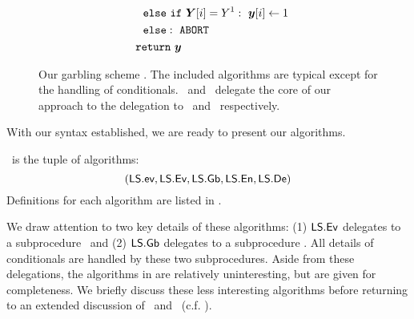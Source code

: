 \begin{figure}
\begin{adjustwidth}{-0.1\textwidth}{-0.1\textwidth}
\begin{minipage}[t]{0.40\linewidth}
\begin{align*}
      &~~~~\celse~\cif~\gcirout[i] = Y^1:~\cirout[i] \gets 1\\
      &~~~~\celse:~\mathtt{ABORT}\\
      &~~\creturn~\cirout
    \end{align*}
  \end{minipage}
  \end{adjustwidth}
  \caption{%
    Our garbling scheme \ourschemelong.
    The included algorithms are typical except for the handling of
    conditionals.
    \gEv\ and \gGb\ delegate the core of our approach to
    the delegation to
    \evcond\ and \gbcond\ respectively.
  }\label{fig:scheme}
\end{figure}


With our syntax established, we are ready to present our algorithms.
\begin{construction}[\ourschemelong]
  \ourschemelong\ is the tuple of algorithms:
  \[ (\textsf{LS}.\textsf{ev}, \textsf{LS}.\textsf{Ev}, \textsf{LS}.\textsf{Gb}, \textsf{LS}.\textsf{En}, \textsf{LS}.\textsf{De}) \]
  Definitions for each algorithm are listed in .
\end{construction}
We draw attention to two key details of these algorithms:
(1) $\textsf{LS}.\textsf{Ev}$ delegates to a subprocedure \evcond\ and (2)
$\textsf{LS}.\textsf{Gb}$ delegates to a subprocedure \gbcond.
%
All details of conditionals are handled by these two subprocedures.
%
Aside from these delegations, the algorithms in  are
relatively uninteresting, but are given for completeness.
We briefly discuss these less interesting algorithms before returning
to an extended discussion of \evcond\ and
\gbcond~(c.f. ).

